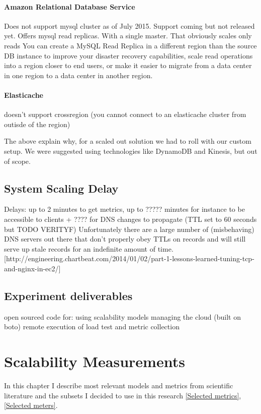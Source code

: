 \documentclass{uvamscse}
\begin{document}
\subsubsection{Amazon Relational Database Service}
Does not support mysql cluster as of July 2015. Support coming but not released yet.
Offers mysql read replicas. With a single master. That obviously scales only reads
You can create a MySQL Read Replica in a different region than the source DB instance to improve your disaster recovery capabilities, scale read operations into a region closer to end users, or make it easier to migrate from a data center in one region to a data center in another region.

\subsubsection{Elasticache}
doesn't support crossregion (you cannot connect to an elasticache cluster from outisde of the region)

The above explain why, for a scaled out solution we had to roll with our custom setup. We were suggested using technologies like DynamoDB and Kinesis, but out of scope.

\section{System Scaling Delay}
Delays: up to 2 minutes to get metrics, up to ????? minutes for instance to be accessible to clients + ???? for DNS changes to propagate (TTL set to 60 seconds but TODO VERITYF)
Unfortunately there are a large number of (misbehaving) DNS servers out there that don’t properly obey TTLs on records and will still serve up stale records for an indefinite amount of time. [http://engineering.chartbeat.com/2014/01/02/part-1-lessons-learned-tuning-tcp-and-nginx-in-ec2/]

\section{Experiment deliverables}\label{Experiment deliverables}
open sourced code for:
using scalability models
managing the cloud (built on boto)
remote execution of load test and metric collection



\chapter{Scalability Measurements} \label{Scalability Measurements}
In this chapter I describe most relevant models and metrics from scientific literature and the subsets I decided to use in this research \ref{Selected metrics}, \ref{Selected meters}.
\end{document}
